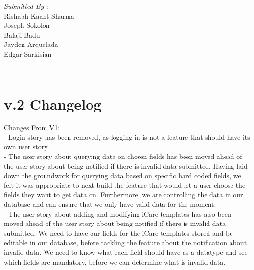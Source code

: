 \documentclass[12pt]{article}
\begin{document}
\begin{titlepage}
\begin{minipage}{0.4\textwidth}
			\begin{flushright} \large
			\emph{Submitted By :} \\
			Rishabh Kaant Sharma\\
            Joseph Sokolon\\
            Balaji Badu\\
            Jayden Arquelada\\
            Edgar Sarkisian\\
		\end{flushright}
        
	\end{minipage}\\[2 cm]
	
	
    
    
    
    
	
\end{titlepage}


\textcolor{black}{\tableofcontents}
\pagebreak

\section{v.2 Changelog}
Changes From V1:\\
- Login story has been removed, as logging in is not a feature that should have its own user story.\\
- The user story about querying data on chosen fields has been moved ahead of the user story about being notified if there is invalid data submitted. Having laid down the groundwork for querying data based on specific hard coded fields, we felt it was appropriate to next build the feature that would let a user choose the fields they want to get data on. Furthermore, we are controlling the data in our database and can ensure that we only have valid data for the moment.\\
- The user story about adding and modifying iCare templates has also been moved ahead of the user story about being notified if there is invalid data submitted. We need to have our fields for the iCare templates stored and be editable in our database, before tackling the feature about the notification about invalid data. We need to know what each field should have as a datatype and see which fields are mandatory, before we can determine what is invalid data.\\
\end{document}
